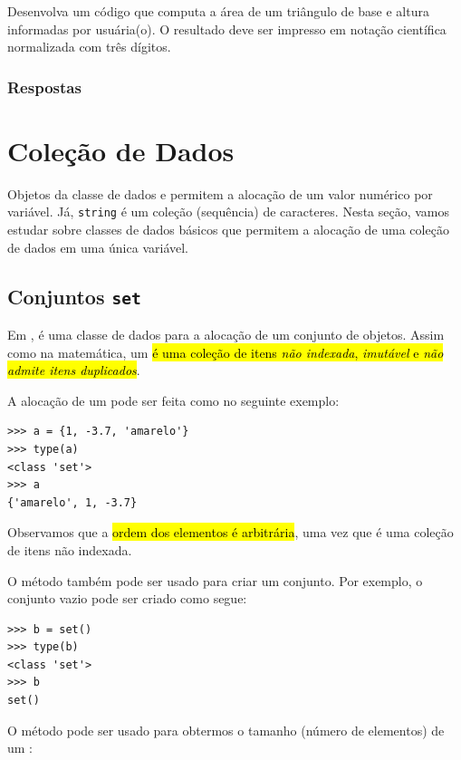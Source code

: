 \begin{exer}
  Desenvolva um código que computa a área de um triângulo de base e altura informadas por usuária(o). O resultado deve ser impresso em notação científica normalizada com três dígitos.
\end{exer}

\ifisbook
\subsubsection{Respostas}
\shipoutAnswer
\fi

\section{Coleção de Dados}\label{cap_lingua_sec_colecao}

Objetos da classe de dados \PYTHONint e \PYTHONfloat permitem a alocação de um valor numérico por variável. Já, \texttt{string} é um coleção (sequência) de caracteres. Nesta seção, vamos estudar sobre classes de dados básicos que permitem a alocação de uma coleção de dados em uma única variável.

\subsection{Conjuntos \texttt{set}}

Em {\python}, {\PYTHONset} é uma classe de dados para a alocação de um conjunto de objetos. Assim como na matemática, um \hl{{\PYTHONset} é uma coleção de itens \emph{não indexada}, \emph{imutável} e \emph{não admite itens duplicados}}.

A alocação de um {\PYTHONset} pode ser feita como no seguinte exemplo:

\begin{lstlisting}
>>> a = {1, -3.7, 'amarelo'}
>>> type(a)
<class 'set'>
>>> a
{'amarelo', 1, -3.7}
\end{lstlisting}

Observamos que a \hl{ordem dos elementos é arbitrária}, uma vez que {\PYTHONset} é uma coleção de itens não indexada.

O método {\PYTHONsetMethod} também pode ser usado para criar um conjunto. Por exemplo, o conjunto vazio pode ser criado como segue:

\begin{lstlisting}
>>> b = set()
>>> type(b)
<class 'set'>
>>> b
set()
\end{lstlisting}

O método {\PYTHONlen} pode ser usado para obtermos o tamanho (número de elementos) de um {\PYTHONset}:

